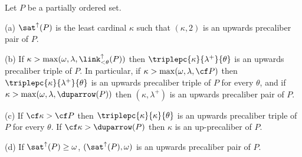  Let $P$ be a partially ordered set.

(a) $\sat^{\uparrow}(P)$ is the least cardinal $\kappa$ such that
$(\kappa,2)$ is an upwards precaliber pair of $P$.

(b) If $\kappa>\max(\omega,\lambda,\link^{\uparrow}_{<\theta}(P))$ then
$\triplepc{\kappa}{\lambda^+}{\theta}$ is an upwards precaliber triple
of $P$.   In particular, if $\kappa>\max(\omega,\lambda,\cf P)$ then
$\triplepc{\kappa}{\lambda^+}{\theta}$ is an upwards precaliber triple
of $P$ for every $\theta$, and if
$\kappa>\max(\omega,\lambda,\duparrow(P))$ then $(\kappa,\lambda^+)$
is an upwards precaliber pair of $P$.

(c) If $\cf\kappa>\cf P$ then $\triplepc{\kappa}{\kappa}{\theta}$ is an
upwards precaliber triple of $P$ for every $\theta$.   If
$\cf\kappa>\duparrow(P)$ then $\kappa$ is an
up-precaliber of $P$.

(d) If $\sat^{\uparrow}(P)\ge\omega$,
$(\sat^{\uparrow}(P),\omega)$ is an upwards precaliber pair of $P$.

